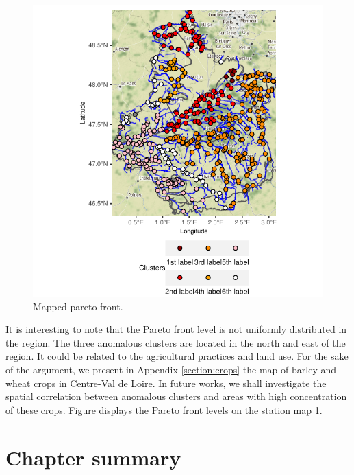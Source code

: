 \begin{figure}[ht]
  \centering
  \includegraphics[]{figs/Chap5/Pareto_map.pdf}
  \caption{Mapped pareto front.}
  \label{fig:pareto:map}
\end{figure}

It is interesting to note that the Pareto front level is not uniformly distributed in the region. The three anomalous clusters are located in the north and east of the region. It could be related to the agricultural practices and land use. For the sake of the argument, we present in Appendix \ref{section:crops} the map of barley and wheat crops in Centre-Val de Loire. In future works, we shall investigate the spatial correlation between anomalous clusters and areas with high concentration of these crops. Figure  displays the Pareto front levels on the station map \ref{fig:pareto:map}.

\section{Chapter summary}

